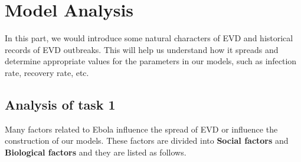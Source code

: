 \section{Model Analysis}
In this part, we would introduce some natural characters of EVD and historical records of EVD outbreaks. This will help us understand how it spreads and determine appropriate values for the parameters in our models, such as infection rate, recovery rate, etc.

\subsection{Analysis of task 1}

\par Many factors related to Ebola influence the spread of EVD or influence the construction of our models. These factors are divided into \textbf{Social factors} and \textbf{Biological factors} and they are listed as follows.

